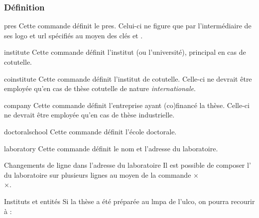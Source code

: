 \subsubsection{Définition}
%
\begin{docCommand}{pres}{}
  Cette commande définit le \gls{pres}. Celui-ci ne figure que par
  l'intermédiaire de ses logo et \acrshort{url} spécifiés au moyen des clés
   et .
\end{docCommand}
%
\begin{docCommand}[doc description=\mandatory]{institute}{}
  Cette commande définit l'institut (ou l'université), principal
  en cas de cotutelle.
\end{docCommand}
%
\begin{docCommand}{coinstitute}{}
  Cette commande définit l'institut de cotutelle. Celle-ci ne
  devrait être employée qu'en cas de thèse cotutelle de nature
  \emph{internationale}.
\end{docCommand}
%
\begin{docCommand}{company}{}
  Cette commande définit l'entreprise ayant (co)financé la thèse.
  Celle-ci ne devrait être employée qu'en cas de thèse industrielle.
\end{docCommand}
%
\begin{docCommand}[doc description=\mandatory]{doctoralschool}{}
  Cette commande définit l'école doctorale.
\end{docCommand}
%
\begin{docCommand}[doc description=\mandatory]{laboratory}{}
  Cette commande définit le nom et l'adresse du laboratoire.
\end{docCommand}
%
\begin{dbremark}{Changements de ligne dans l'adresse du laboratoire}{}
  Il est possible de composer l' du laboratoire sur plusieurs
  lignes au moyen de la commande ×\\×.
\end{dbremark}
%
\begin{dbexample}{Instituts et entités}{}
  Si la thèse a été préparée au \gls{lmpa} de l'\gls{ulco}, on
  pourra recourir à :
  \NoAutoSpacing%
\begin{bodycode}
\end{bodycode}
\end{dbexample}
